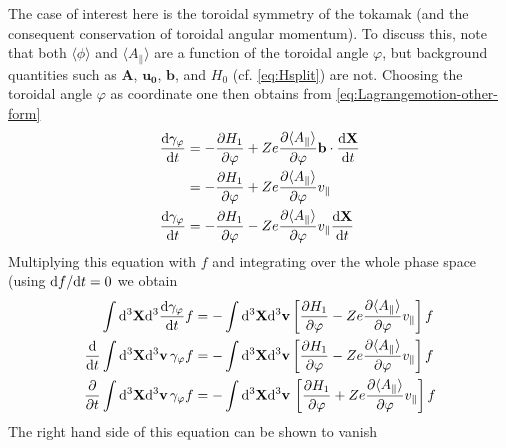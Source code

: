 The case of interest here is the toroidal symmetry of the tokamak (and the consequent 
conservation of toroidal angular momentum). To discuss this, note that both $\langle \phi \rangle$ and 
$\langle A_\parallel \rangle$ are a function of the toroidal angle $\varphi$, but background quantities such as $\mathbf{A}$, $\mathbf{u_0}$, $\mathbf{b}$, and $H_0$ (cf. \eqref{eq:Hsplit}) are not.
Choosing the toroidal angle $\varphi$ as coordinate one then
obtains from \eqref{eq:Lagrangemotion-other-form}
\begin{align} 
\frac{\mathrm{d} \gamma_\varphi}{\mathrm{d} t} &= - \frac{\partial H_1}{\partial \varphi} + Ze \frac{\partial \langle A_\parallel \rangle}{\partial \varphi } \mathbf{b}\cdot \frac{\mathrm{d} \bf X}{\mathrm{d} t} 
\nonumber\\
&= - \frac{\partial H_1}{\partial \varphi} + Ze \frac{\partial \langle A_\parallel \rangle}{\partial \varphi } v_\parallel \\
\frac{\mathrm{d} \gamma_\varphi}{\mathrm{d} t} &= - \frac{\partial H_1}{\partial \varphi} - Ze \frac{\partial \langle A_\parallel \rangle}{\partial \varphi } v_\parallel \frac{\mathrm{d} \bf X}{\mathrm{d} t} 
\end{align}
Multiplying this equation with $f$ and integrating over the whole phase space (using ${{\rm d} f / {\rm d} t} = 0$ we obtain 
\begin{align} 
\int {\rm d}^3 {\bf X} {\rm d}^3\frac{\mathrm{d} \gamma_\varphi}{\mathrm{d} t}f &= - \int {\rm d}^3 {\bf X} {\rm d}^3\mathbf{v}\left [
\frac{\partial H_1}{\partial \varphi} - Ze \frac{\partial \langle A_\parallel \rangle}{\partial \varphi } v_\parallel
 \right]f
\\
 \frac{\mathrm{d} }{\mathrm{d}  t} \int {\rm d}^3 {\bf X} {\rm d}^3 {\bf v} \, \gamma_\varphi f&= - \int {\rm d}^3 {\bf X} {\rm d}^3\mathbf{v}\left [
\frac{\partial H_1}{\partial \varphi} - Ze \frac{\partial \langle A_\parallel \rangle}{\partial \varphi } v_\parallel
 \right]f
\\
\frac{\partial }{\partial  t} \int {\rm d}^3 {\bf X} {\rm d}^3 {\bf v} \, \gamma_\varphi f &= 
- \int {\rm d}^3 {\bf X} {\rm d}^3 {\bf v} \,\left [ \frac{\partial H_1}{\partial \varphi} + Z e \frac{\partial \langle A_\parallel\rangle}{\partial  \varphi} v_\parallel \right ] f 
\end{align}
The right hand side of this equation can be shown to vanish

